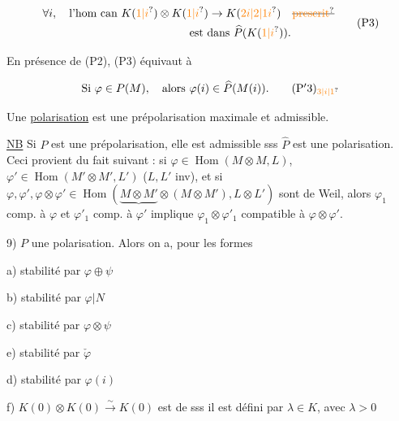 \[
\begin{aligned}
&\forall i,\quad\text{l'hom can }K(\unsure{1|i})\otimes K(\unsure{1|i})\to K(\unsure{2i|2|1i})\quad\deleted{\text{\unsure{prescrit}}}\\
&\hspace{13em}\text{est dans }\widehat P(K(\unsure{1|i})).
\end{aligned}\tag*{(P3)}
\]

En présence de (P2), (P3) équivaut à


\[
\text{Si }\varphi\in P(M),\quad\text{alors }\varphi(i)\in\widehat P(M(i)).\tag*{$(\mathrm P'3)_{\unsure{3|i|1}}$}
\]


Une \uline{polarisation} est une prépolarisation maximale et admissible.

\uline{NB} Si $P$ est une prépolarisation, elle est admissible sss $\widehat P$ est une polarisation. Ceci provient du fait suivant : si $\varphi\in\operatorname{Hom}(M\otimes M,L)$, $\varphi'\in\operatorname{Hom}(M'\otimes M',L')$ ($L,L'$ inv), et si $\varphi,\varphi',\varphi\otimes\varphi'\in\operatorname{Hom}(\underbrace{M\otimes M'}\otimes(M\otimes M'),L\otimes L')$ sont de Weil, alors $\varphi_1$ comp. à $\varphi$ et $\varphi'_1$ comp. à $\varphi'$ implique $\varphi_1\otimes\varphi'_1$ compatible à $\varphi\otimes\varphi'$.


9)  $P$ une polarisation. Alors on a, pour les formes 

a) stabilité par $\varphi\oplus\psi$ 

b) stabilité par $\varphi|N$

c) stabilité par $\varphi\otimes\psi$

e) stabilité par $\check\varphi$

d) stabilité par $\varphi(i)$

f)  $K(0)\otimes K(0)\xrightarrow{\sim}K(0)$ est de  sss il est défini par $\lambda\in K$, avec $\lambda>0$


